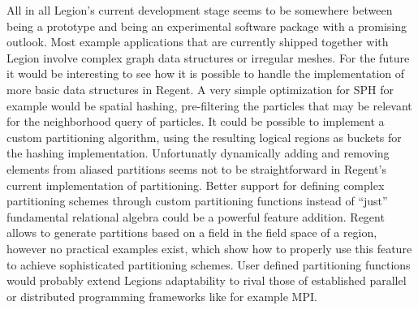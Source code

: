 \documentclass{article}      %
\begin{document}
All in all Legion's current development stage seems to be somewhere between being a prototype and being an experimental software package with a promising outlook. Most example applications that are currently shipped together with Legion involve complex graph data structures or irregular meshes. For the future it would be interesting to see how it is possible to handle the implementation of more basic data structures in Regent. A very simple optimization for SPH for example would be spatial hashing, pre-filtering the particles that may be relevant for the neighborhood query of particles. It could be possible to implement a custom partitioning algorithm, using the resulting logical regions as buckets for the hashing implementation. Unfortunatly dynamically adding and removing elements from aliased partitions seems not to be straightforward in Regent's current implementation of partitioning. Better support for defining complex partitioning schemes through custom partitioning functions instead of ``just'' fundamental relational algebra could be a powerful feature addition. Regent allows to generate partitions based on a field in the field space of a region, however no practical examples exist, which show how to properly use this feature to achieve sophisticated partitioning schemes. User defined partitioning functions would probably extend Legions adaptability to rival those of established parallel or distributed programming frameworks like for example MPI.\pagebreak




\pagebreak
\end{document}
